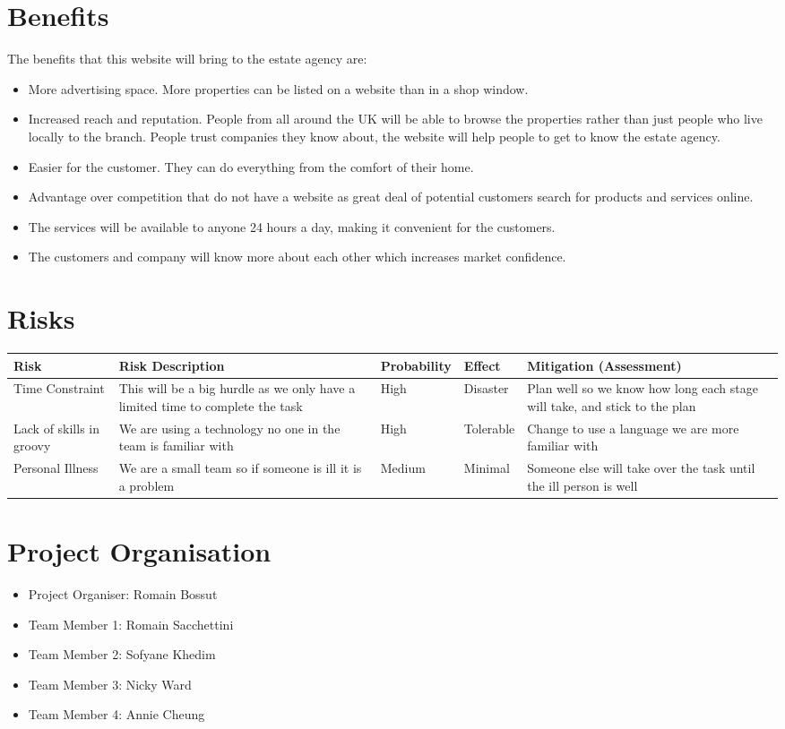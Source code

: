 \documentclass[a4paper,12pt]{article}
\begin{document}
 

\section{Benefits}

 

The benefits that this website will bring to the estate agency are:

 
\begin{itemize}
\item More advertising space. More properties can be listed on a website than in a shop window.
\item Increased reach and reputation. People from all around the UK will be able to browse the properties rather than just people who live locally to the branch. People trust companies they know about, the website will help people to get to know the estate agency.
\item Easier for the customer. They can do everything from the comfort of their home.
\item Advantage over competition that do not have a website as great deal of potential customers search for products and services online.
\item The services will be available to anyone 24 hours a day, making it convenient for the customers.
\item The customers and company will know more about each other which increases market confidence.
\end{itemize}

\section{Risks}


\begin{center}
  \begin{tabular}{| p{3cm} | p{3cm} | p{1.8cm} | p{1.8cm} | p{3.2cm}|}
    \hline
    Risk & Risk Description & Probability & Effect & Mitigation (Assessment)\\ \hline
    Time Constraint & This will be a big hurdle as we only have a limited time to complete the task & High & Disaster & Plan well so we know how long each stage will take, and stick to the plan\\ \hline
    Lack of skills in groovy & We are using a technology no one in the team is familiar with & High & Tolerable & Change to use a language we are more familiar with\\ \hline
    Personal Illness & We are a small team so if someone is ill it is a problem & Medium & Minimal & Someone else will take over the task until the ill person is well\\
	\hline
  \end{tabular}
\end{center}


\section{Project Organisation}
\begin{itemize}
\item Project Organiser: Romain Bossut
\item Team Member 1: Romain Sacchettini
\item Team Member 2: Sofyane Khedim
\item Team Member 3: Nicky Ward
\item Team Member 4: Annie Cheung 
\end{itemize}
\end{document}

